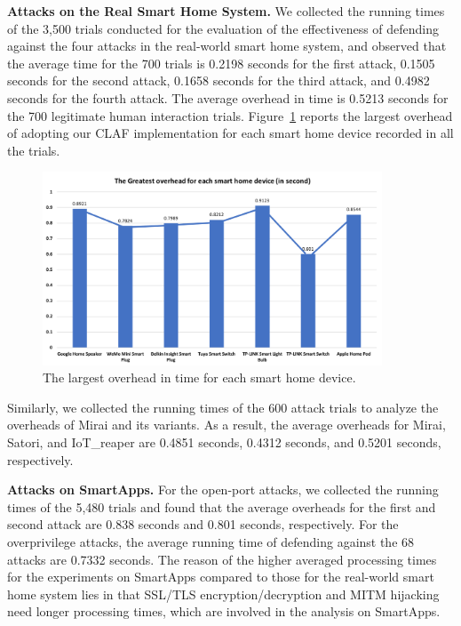 \documentclass[letterpaper,12pt]{article}
\begin{document}
\textbf{Attacks on the Real Smart Home System.} 
We collected the running times of the 3,500 trials conducted for the evaluation of the effectiveness of defending against the four attacks in the real-world smart home system, and observed that the average time for the 700 trials is 0.2198 seconds for the first attack, 0.1505 seconds for the second attack, 0.1658 seconds for the third attack, and  0.4982 seconds for the fourth attack. The average overhead in time is 0.5213 seconds for the 700 legitimate human interaction trials. Figure~\ref{fig:overhead} reports the largest overhead of adopting our CLAF implementation for each smart home device recorded in all the trials. 

\begin{figure}[!htb]
        \centering
        \includegraphics[width=0.9\textwidth]{overhead.png}
        \caption{The largest overhead in time for each smart home device.}
        \label{fig:overhead}
\end{figure}

Similarly, we collected the running times of the 600 attack trials to analyze the overheads of Mirai and its variants. As a result, the average overheads for Mirai, Satori, and IoT\_reaper are 0.4851 seconds, 0.4312 seconds, and 0.5201 seconds, respectively.

\textbf{Attacks on SmartApps.} 
For the open-port attacks, we collected the running times of the 5,480 trials and found that the average overheads for the first and second attack are 0.838 seconds and 0.801 seconds, respectively. For the overprivilege attacks, the average running time of defending against the 68 attacks are 0.7332 seconds. The reason of the higher averaged processing times for the experiments on SmartApps compared to those for the real-world smart home system lies in that SSL/TLS encryption/decryption and MITM hijacking need longer processing times, which are involved in the analysis on SmartApps.
\end{document}
